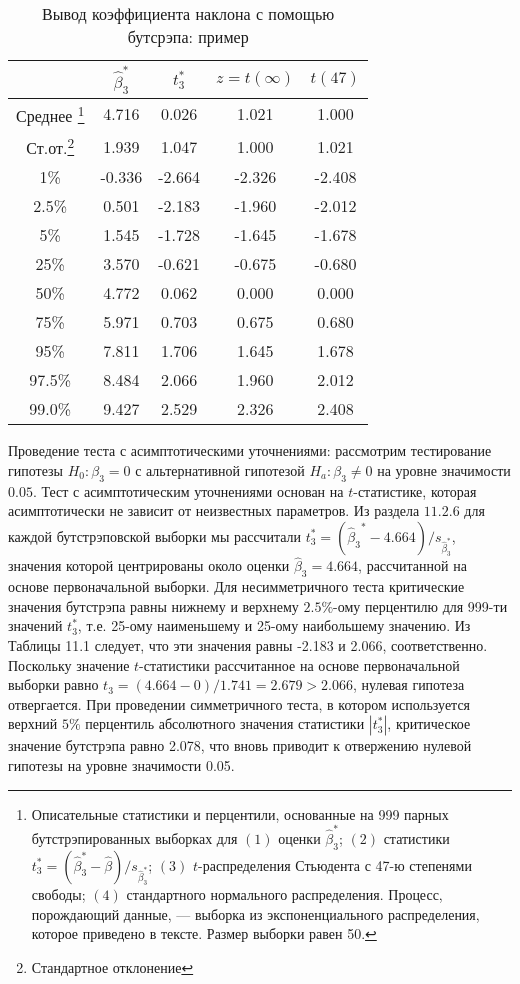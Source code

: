 \begin{table}[h]
\begin{center}
\caption{\label{tab:pred} Вывод коэффициента наклона с помощью бутсрэпа: пример}
\begin{minipage}{9cm}
\begin{tabular}{ccccc}
\hline
\hline
& $\hat{\beta}^*_3$ & $t^*_3$ & $z = t(\infty)$ & $t(47)$ \\ 
\hline 
Среднее \footnote{Описательные статистики и перцентили, основанные на 999 парных бутстрэпированных выборках для $(1)$ оценки $\hat{\beta}^*_3$; $(2)$ статистики $t^*_3 = (\hat{\beta}^*_3 - \hat{\beta})/s_{\hat{\beta}^*_3}$;
 $(3)$ $t$-распределения Стьюдента с 47-ю степенями свободы; $(4)$ стандартного нормального распределения. Процесс, порождающий данные, --- выборка из экспоненциального распределения, которое приведено в тексте. Размер выборки равен 50.} & 4.716 & 0.026 & 1.021 & 1.000 \\ 
Ст.от.\footnote{Стандартное отклонение} & 1.939 & 1.047 & 1.000 & 1.021 \\
1\% & -0.336 & -2.664 & -2.326 & -2.408 \\
2.5\% & 0.501 & -2.183 & -1.960 & -2.012 \\
5\% & 1.545 & -1.728 & -1.645 & -1.678 \\
25\% & 3.570 & -0.621 & -0.675 & -0.680 \\
50\% & 4.772 & 0.062 & 0.000 & 0.000 \\
75\% & 5.971 & 0.703 & 0.675 & 0.680 \\
95\% & 7.811 & 1.706 & 1.645 & 1.678 \\
97.5\% & 8.484 & 2.066 & 1.960 & 2.012 \\
99.0\% & 9.427 & 2.529 & 2.326 & 2.408 \\
\hline
\hline
\end{tabular}
\end{minipage}
\end{center}
\end{table} 

Проведение теста с асимптотическими уточнениями: рассмотрим тестирование гипотезы $H_0:\beta_{3}=0$ с альтернативной гипотезой $H_a: \beta_3 \neq 0$ на уровне значимости $0.05$. Тест с асимптотическим уточнениями основан на $t$-статистике, которая асимптотически не зависит от неизвестных параметров. Из раздела $11.2.6$ для каждой бутстрэповской выборки мы рассчитали $t_3^*=({\hat{\beta}_3}^*-4.664)/s_{\hat{\beta}_3^*}$, значения которой центрированы около оценки $\hat{\beta}_3=4.664$, рассчитанной на основе первоначальной выборки. Для несимметричного теста критические значения бутстрэпа равны нижнему и верхнему $2.5\%$-ому перцентилю для 999-ти значений $t_3^*$, т.е. 25-ому наименьшему и 25-ому наибольшему значению. Из Таблицы 11.1 следует, что эти значения равны -2.183 и 2.066, соответственно. Поскольку значение $t$-статистики рассчитанное на основе первоначальной выборки равно $t_3=(4.664-0)/1.741=2.679 > 2.066$, нулевая гипотеза отвергается. При проведении симметричного теста, в котором используется верхний $5\%$ перцентиль абсолютного значения статистики $|t_3^*|$, критическое значение бутстрэпа равно 2.078, что вновь приводит к отвержению нулевой гипотезы на уровне значимости 0.05.

